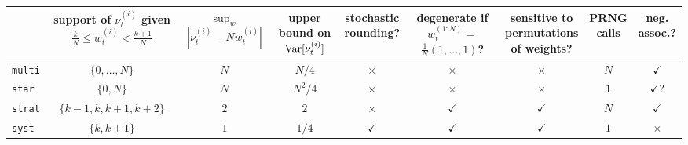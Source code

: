 


\begin{landscape}
\begin{table}[ht]
\centering
\begin{tabular}{ l | c c c c c c c c }
\hline\hline
& \thead{support of $\nu_t^{(i)}$ given
            \\ $ \frac{k}{N} \leq w_t^{(i)} < \frac{k+1}{N}$} 
        & \thead{$\sup_w$\\ $|\nu_t^{(i)} - Nw_t^{(i)}|$}
        & \thead{upper\\ bound on \\ $\operatorname{Var}[\nu_t^{(i)}]$}
        & \thead{stochastic\\ rounding?}       
        & \thead{degenerate if\\ $w_t^{(1:N)} =$\\ $\frac{1}{N}(1,\dots,1)$?} 
        & \thead{sensitive to\\ permutations\\ of weights?} 
        & \thead{PRNG\\ calls}
        & \thead{neg.\\ assoc.?} \\
\hline
\texttt{multi} & $\{0,\dots,N\}$ & $N$ & $N/4$ & $\times$ & $\times$ 
        & $\times$ & $N$ & $\checkmark$ \\
\texttt{star} & $\{0, N\}$ & $N$ & $N^2/4$ & $\times$ & $\times$ 
        & $\times$ & $1$ & $\checkmark$? \\
\texttt{strat} & $\{k-1, k, k+1, k+2\}$ & $2$ & $2$ & $\times$ & $\checkmark$ 
        & $\checkmark$ & $N$ & $\checkmark$ \\
\texttt{syst} & $\{k, k+1\}$ & $1$ & $1/4$ & $\checkmark$ & $\checkmark$ 
        & $\checkmark$ & $1$ & $\times$ \\

\end{tabular}
\end{table}
\end{landscape}
